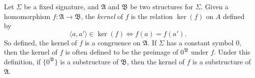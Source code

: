 \documentclass[12pt]{article}
\let	\Iff		=	\Leftrightarrow
\newcommand{\set}[1]{\{#1\}}
\newcommand{\tuple}[1]{\langle#1\rangle}
\newcommand{\A}{\mathfrak{A}}
\newcommand{\B}{\mathfrak{B}}
\begin{document}
Let $\Sigma$ be a fixed signature, and $\A$ and $\B$ be two structures for $\Sigma$. Given a homomorphism $f\colon \A \to \B$, the \emph{kernel} of $f$ is the relation $\ker(f)$ on $A$ defined by
 \[
 \tuple{a,a'} \in \ker(f) \Iff f(a) = f(a').
 \]
So defined, the kernel of $f$ is a congruence on $\A$. If $\Sigma$ has a constant symbol 0, then the kernel of $f$ is often defined to be the preimage of $0^\B$ under $f$. Under this definition, if $\set{0^\B}$ is a substructure of $\B$, then the kernel of $f$ is a substructure of $\A$.
\end{document}
